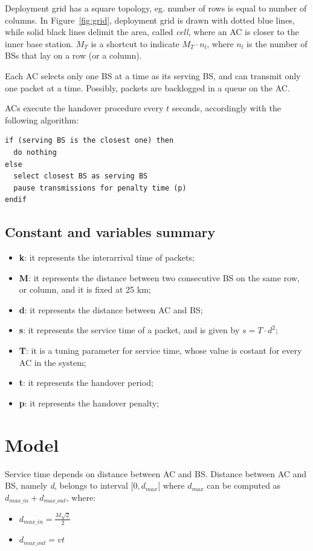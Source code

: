 \documentclass[a4paper,12pt]{article}
\begin{document}
Deployment grid has a square topology, eg. number of rows is equal to number of columns.
In Figure~\ref{fig:grid}, deployment grid is drawn with dotted blue lines, while solid black lines delimit the area, called \emph{cell}, where an AC is closer to the inner base station.
$M_T$ is a shortcut to indicate $M_T \cdot n_{l}$, where $n_{l}$ is the number of BSs that lay on a row (or a column).

Each AC selects only one BS at a time as its serving BS, and can transmit only one packet at a time.
Possibly, packets are backlogged in a queue on the AC.

ACs execute the handover procedure every $t$ seconds, accordingly with the following algorithm:
\begin{verbatim}
if (serving BS is the closest one) then
  do nothing
else
  select closest BS as serving BS
  pause transmissions for penalty time (p)
endif
\end{verbatim}

\subsection{Constant and variables summary}
\begin{itemize}
  \item \textbf{k}: it represents the interarrival time of packets;
  \item \textbf{M}: it represents the distance between two consecutive BS on the same row, or column, and it is fixed at 25 km;
  \item \textbf{d}: it represents the distance between AC and BS;
  \item \textbf{s}: it represents the service time of a packet, and is given by $s = T \cdot d^{2}$;
  \item \textbf{T}: it is a tuning parameter for service time, whose value is costant for every AC in the system;
  \item \textbf{t}: it represents the handover period;
  \item \textbf{p}: it represents the handover penalty;
\end{itemize}

\section{Model}

Service time depends on distance between AC and BS.
Distance between AC and BS, namely \emph{d}, belongs to interval $[ 0, d_{max} [$ where $d_{max}$ can be computed as $d_{max\_in} + d_{max\_out}$, where:
\begin{itemize}
  \item $d_{max\_in} = \frac{M \sqrt{2}}{2} $
  \item $d_{max\_out} = vt$
\end{itemize}
\end{document}
